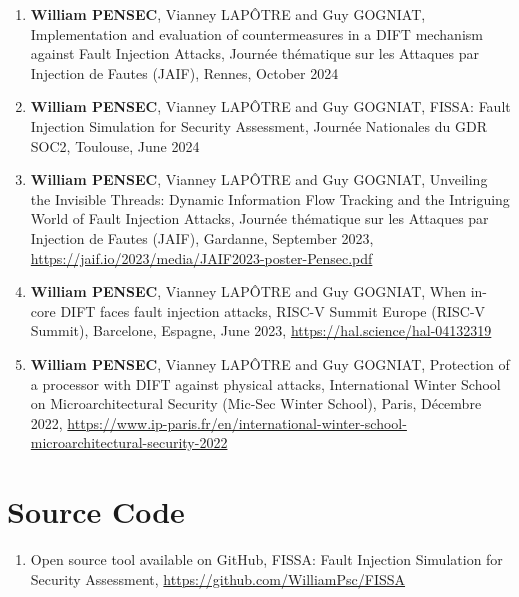 \begin{enumerate}
    \item \textbf{William PENSEC}, Vianney LAPÔTRE and Guy GOGNIAT, Implementation and evaluation of countermeasures in a DIFT mechanism against Fault Injection Attacks, Journée thématique sur les Attaques par Injection de Fautes (JAIF), Rennes, October 2024
    \item \textbf{William PENSEC}, Vianney LAPÔTRE and Guy GOGNIAT, FISSA: Fault Injection Simulation for Security Assessment, Journée Nationales du GDR SOC2, Toulouse, June 2024
    \item \textbf{William PENSEC}, Vianney LAPÔTRE and Guy GOGNIAT, Unveiling the Invisible Threads: Dynamic Information Flow Tracking and the Intriguing World of Fault Injection Attacks, Journée thématique sur les Attaques par Injection de Fautes (JAIF), Gardanne, September 2023, \url{https://jaif.io/2023/media/JAIF2023-poster-Pensec.pdf}
    \item \textbf{William PENSEC}, Vianney LAPÔTRE and Guy GOGNIAT, When in-core DIFT faces fault injection attacks, RISC-V Summit Europe (RISC-V Summit), Barcelone, Espagne, June 2023, \url{https://hal.science/hal-04132319}
    \item \textbf{William PENSEC}, Vianney LAPÔTRE and Guy GOGNIAT, Protection of a processor with DIFT against physical attacks, International Winter School on Microarchitectural Security (Mic-Sec Winter School), Paris, Décembre 2022, \url{https://www.ip-paris.fr/en/international-winter-school-microarchitectural-security-2022}
\end{enumerate}
\section{Source Code}

\begin{enumerate}
    \item Open source tool available on GitHub, FISSA: Fault Injection Simulation for Security Assessment, \url{https://github.com/WilliamPsc/FISSA}
\end{enumerate}
